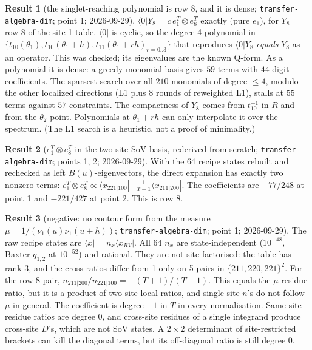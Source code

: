 \documentclass[11pt]{article}
\newcommand{\nb}[1]{\texttt{#1}}
\newcommand{\vac}{\langle 0|}
\theoremstyle{definition}
\newtheorem{result}{Result}
\theoremstyle{remark}
\begin{document}
\begin{result}[{the singlet-reaching polynomial is row 8, and it is dense; \nb{transfer-algebra-dim}; point 1; 2026-09-29}]
$\vac Y_8=c\,e_1^T\otimes e_8^T$ exactly (pure $e_1$), for $Y_8$ = row 8 of the site-1 table. $\vac$ is cyclic, so the degree-4 polynomial in $\{t_{10}(\theta_1),t_{10}(\theta_1+h),t_{11}(\theta_1+rh)_{r=0..3}\}$ that reproduces $\vac Y_8$ \emph{equals} $Y_8$ as an operator. This was checked; its eigenvalues are the known Q-form.
As a polynomial it is dense: a greedy monomial basis gives $59$ terms with $44$-digit coefficients. The sparsest search over all $210$ monomials of degree $\le4$, modulo the other localized directions (L1 plus 8 rounds of reweighted L1), stalls at $55$ terms against $57$ constraints.
The compactness of $Y_8$ comes from $t_{10}^{-1}$ in $R$ and from the $\theta_2$ point. Polynomials at $\theta_1+rh$ can only interpolate it over the spectrum. (The L1 search is a heuristic, not a proof of minimality.)
\end{result}

\begin{result}[{$e_1^T\otimes e_8^T$ in the two-site SoV basis, rederived from scratch; \nb{transfer-algebra-dim}; points 1, 2; 2026-09-29}]
With the 64 recipe states rebuilt and rechecked as left $B(u)$-eigenvectors, the direct expansion has exactly two nonzero terms:
$e_1^T\otimes e_8^T\propto\langle x_{221|100}|-\frac1{T+1}\langle x_{211|200}|$. The coefficients are $-77/248$ at point 1 and $-221/427$ at point 2. This is row 8.
\end{result}

\begin{result}[{negative: no contour form from the measure $\mu=1/(\nu_1(u)\nu_1(u+h))$; \nb{transfer-algebra-dim}; point 1; 2026-09-29}]
The raw recipe states are $\langle x|=n_x\langle x_{RV}|$. All 64 $n_x$ are state-independent ($10^{-48}$, Baxter $q_{1,2}$ at $10^{-52}$) and rational.
They are not site-factorised: the table has rank 3, and the cross ratios differ from 1 only on 5 pairs in $\{211,220,221\}^2$.
For the row-8 pair, $n_{211|200}/n_{221|100}=-(T+1)/(T-1)$. This equals the $\mu$-residue ratio, but it is a product of two site-local ratios, and single-site $n$'s do not follow $\mu$ in general.
The coefficient is degree $-1$ in $T$ in every normalisation. Same-site residue ratios are degree 0, and cross-site residues of a single integrand produce cross-site $D$'s, which are not SoV states.
A $2\times2$ determinant of site-restricted brackets can kill the diagonal terms, but its off-diagonal ratio is still degree 0.
\end{result}
\end{document}
